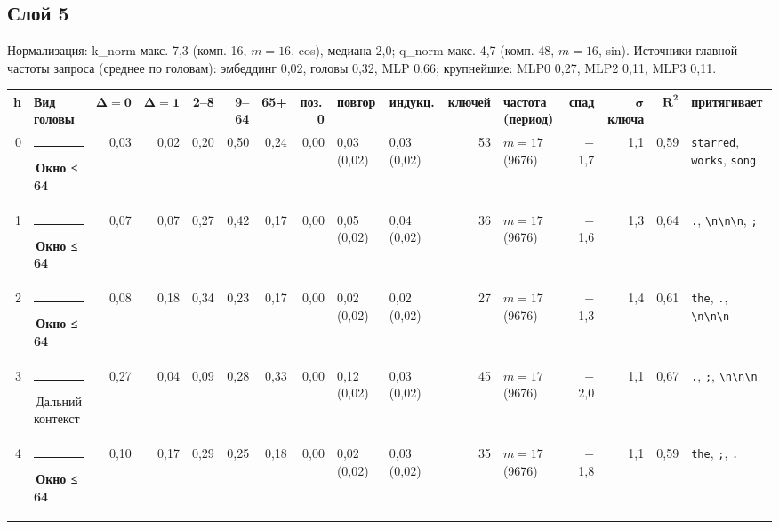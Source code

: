 \documentclass[10pt]{article}
\begin{document}
\noindent\begin{minipage}{\linewidth}
\subsection*{Слой 5}
{\small\color{ink2} Нормализация: k\_norm макс. 7,3 (комп. 16, $m{=}16$, cos), медиана 2,0; q\_norm макс. 4,7 (комп. 48, $m{=}16$, sin). Источники главной частоты запроса (среднее по головам): эмбеддинг 0,02, головы 0,32, MLP 0,66; крупнейшие: MLP0 0,27, MLP2 0,11, MLP3 0,11.}
\begin{center}{\footnotesize\begin{tabular}{|r|l|r|r|r|r|r|r|l|l|r|l|r|r|r|l|}
\hline
\rowcolor{head}\textbf{h} & \textbf{Вид головы} & $\boldsymbol{\Delta{=}0}$ & $\boldsymbol{\Delta{=}1}$ & \textbf{2–8} & \textbf{9–64} & \textbf{65+} & \textbf{поз.\,0} & \textbf{повтор} & \textbf{индукц.} & \textbf{ключей} & \textbf{частота (период)} & \textbf{спад} & $\boldsymbol{\sigma}$ \textbf{ключа} & $\boldsymbol{R^2}$ & \textbf{притягивает} \\ \hline
0 & \textcolor[HTML]{EDA100}{\rule{0.62em}{0.62em}}\,\textbf{Окно ≤ 64} & 0,03 & 0,02 & 0,20 & 0,50 & 0,24 & 0,00 & 0,03 (0,02) & 0,03 (0,02) & 53 & $m{=}17$ (9676) & $-$1,7 & 1,1 & 0,59 & \texttt{\textvisiblespace{}starred}, \texttt{\textvisiblespace{}works}, \texttt{\textvisiblespace{}song} \\ \hline
1 & \textcolor[HTML]{EDA100}{\rule{0.62em}{0.62em}}\,\textbf{Окно ≤ 64} & 0,07 & 0,07 & 0,27 & 0,42 & 0,17 & 0,00 & 0,05 (0,02) & 0,04 (0,02) & 36 & $m{=}17$ (9676) & $-$1,6 & 1,3 & 0,64 & \texttt{\textvisiblespace{}.}, \texttt{\textvisiblespace{}\textbackslash{}n\textbackslash{}n\textbackslash{}n}, \texttt{\textvisiblespace{};} \\ \hline
2 & \textcolor[HTML]{EDA100}{\rule{0.62em}{0.62em}}\,\textbf{Окно ≤ 64} & 0,08 & 0,18 & 0,34 & 0,23 & 0,17 & 0,00 & 0,02 (0,02) & 0,02 (0,02) & 27 & $m{=}17$ (9676) & $-$1,3 & 1,4 & 0,61 & \texttt{\textvisiblespace{}the}, \texttt{\textvisiblespace{}.}, \texttt{\textvisiblespace{}\textbackslash{}n\textbackslash{}n\textbackslash{}n} \\ \hline
3 & \textcolor[HTML]{C3C2B7}{\rule{0.62em}{0.62em}}\,Дальний контекст & 0,27 & 0,04 & 0,09 & 0,28 & 0,33 & 0,00 & 0,12 (0,02) & 0,03 (0,02) & 45 & $m{=}17$ (9676) & $-$2,0 & 1,1 & 0,67 & \texttt{\textvisiblespace{}.}, \texttt{\textvisiblespace{};}, \texttt{\textvisiblespace{}\textbackslash{}n\textbackslash{}n\textbackslash{}n} \\ \hline
4 & \textcolor[HTML]{EDA100}{\rule{0.62em}{0.62em}}\,\textbf{Окно ≤ 64} & 0,10 & 0,17 & 0,29 & 0,25 & 0,18 & 0,00 & 0,02 (0,02) & 0,03 (0,02) & 35 & $m{=}17$ (9676) & $-$1,8 & 1,1 & 0,59 & \texttt{\textvisiblespace{}the}, \texttt{\textvisiblespace{};}, \texttt{\textvisiblespace{}.} \\ \hline

\end{tabular}}
\end{center}
\end{minipage}
\end{document}
